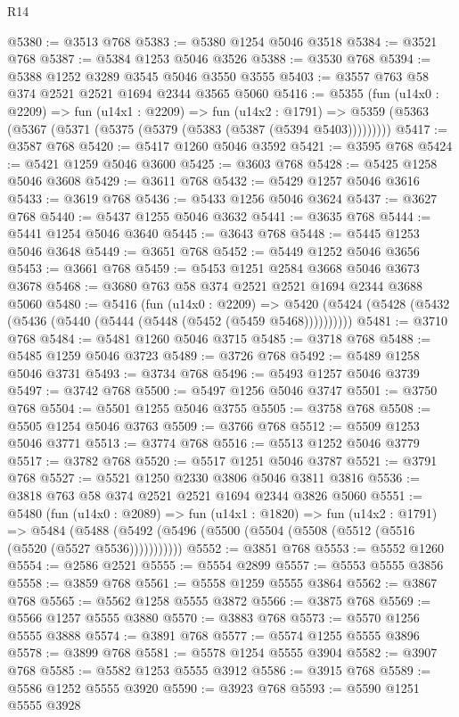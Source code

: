 \begin{lexlean}{R14}
\begin{coremodule}
@5380 := @3513 @768
@5383 := @5380 @1254 @5046 @3518
@5384 := @3521 @768
@5387 := @5384 @1253 @5046 @3526
@5388 := @3530 @768
@5394 := @5388 @1252 @3289 @3545 @5046 @3550 @3555
@5403 := @3557 @763 @58 @374 @2521 @2521 @1694 @2344 @3565 @5060
@5416 := @5355
    (fun (u14x0 : @2209) =>
    fun (u14x1 : @2209) =>
    fun (u14x2 : @1791) =>
    @5359 (@5363 (@5367 (@5371 (@5375 (@5379 (@5383 (@5387 (@5394 @5403)))))))))
@5417 := @3587 @768
@5420 := @5417 @1260 @5046 @3592
@5421 := @3595 @768
@5424 := @5421 @1259 @5046 @3600
@5425 := @3603 @768
@5428 := @5425 @1258 @5046 @3608
@5429 := @3611 @768
@5432 := @5429 @1257 @5046 @3616
@5433 := @3619 @768
@5436 := @5433 @1256 @5046 @3624
@5437 := @3627 @768
@5440 := @5437 @1255 @5046 @3632
@5441 := @3635 @768
@5444 := @5441 @1254 @5046 @3640
@5445 := @3643 @768
@5448 := @5445 @1253 @5046 @3648
@5449 := @3651 @768
@5452 := @5449 @1252 @5046 @3656
@5453 := @3661 @768
@5459 := @5453 @1251 @2584 @3668 @5046 @3673 @3678
@5468 := @3680 @763 @58 @374 @2521 @2521 @1694 @2344 @3688 @5060
@5480 := @5416
    (fun (u14x0 : @2209) =>
    @5420 (@5424 (@5428 (@5432 (@5436 (@5440 (@5444 (@5448 (@5452 (@5459 @5468))))))))))
@5481 := @3710 @768
@5484 := @5481 @1260 @5046 @3715
@5485 := @3718 @768
@5488 := @5485 @1259 @5046 @3723
@5489 := @3726 @768
@5492 := @5489 @1258 @5046 @3731
@5493 := @3734 @768
@5496 := @5493 @1257 @5046 @3739
@5497 := @3742 @768
@5500 := @5497 @1256 @5046 @3747
@5501 := @3750 @768
@5504 := @5501 @1255 @5046 @3755
@5505 := @3758 @768
@5508 := @5505 @1254 @5046 @3763
@5509 := @3766 @768
@5512 := @5509 @1253 @5046 @3771
@5513 := @3774 @768
@5516 := @5513 @1252 @5046 @3779
@5517 := @3782 @768
@5520 := @5517 @1251 @5046 @3787
@5521 := @3791 @768
@5527 := @5521 @1250 @2330 @3806 @5046 @3811 @3816
@5536 := @3818 @763 @58 @374 @2521 @2521 @1694 @2344 @3826 @5060
@5551 := @5480
    (fun (u14x0 : @2089) =>
    fun (u14x1 : @1820) =>
    fun (u14x2 : @1791) =>
    @5484 (@5488 (@5492 (@5496 (@5500 (@5504 (@5508 (@5512 (@5516 (@5520 (@5527 @5536)))))))))))
@5552 := @3851 @768
@5553 := @5552 @1260
@5554 := @2586 @2521
@5555 := @5554 @2899
@5557 := @5553 @5555 @3856
@5558 := @3859 @768
@5561 := @5558 @1259 @5555 @3864
@5562 := @3867 @768
@5565 := @5562 @1258 @5555 @3872
@5566 := @3875 @768
@5569 := @5566 @1257 @5555 @3880
@5570 := @3883 @768
@5573 := @5570 @1256 @5555 @3888
@5574 := @3891 @768
@5577 := @5574 @1255 @5555 @3896
@5578 := @3899 @768
@5581 := @5578 @1254 @5555 @3904
@5582 := @3907 @768
@5585 := @5582 @1253 @5555 @3912
@5586 := @3915 @768
@5589 := @5586 @1252 @5555 @3920
@5590 := @3923 @768
@5593 := @5590 @1251 @5555 @3928

\end{coremodule}
\end{lexlean}
